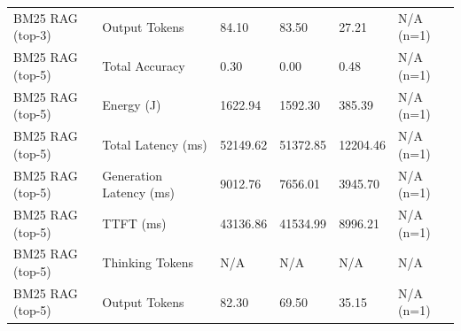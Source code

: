 \begin{table}
\begin{tabular}{llllll}
BM25 RAG (top-3) & Output Tokens & 84.10 & 83.50 & 27.21 & N/A (n=1) \\
BM25 RAG (top-5) & Total Accuracy & 0.30 & 0.00 & 0.48 & N/A (n=1) \\
BM25 RAG (top-5) & Energy (J) & 1622.94 & 1592.30 & 385.39 & N/A (n=1) \\
BM25 RAG (top-5) & Total Latency (ms) & 52149.62 & 51372.85 & 12204.46 & N/A (n=1) \\
BM25 RAG (top-5) & Generation Latency (ms) & 9012.76 & 7656.01 & 3945.70 & N/A (n=1) \\
BM25 RAG (top-5) & TTFT (ms) & 43136.86 & 41534.99 & 8996.21 & N/A (n=1) \\
BM25 RAG (top-5) & Thinking Tokens & N/A & N/A & N/A & N/A \\
BM25 RAG (top-5) & Output Tokens & 82.30 & 69.50 & 35.15 & N/A (n=1) \\
\bottomrule
\end{tabular}
\end{table}
